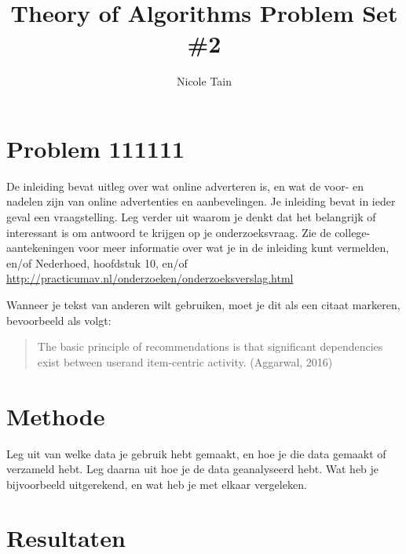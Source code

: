 \documentclass[11pt]{article}
\title{Theory of Algorithms Problem Set \#2}
\author{Nicole Tain}
\begin{document}
\maketitle                  %
\thispagestyle{empty}       %

\section*{Problem 111111}

De inleiding bevat uitleg over wat online adverteren is, en wat de voor- en nadelen zijn van online advertenties en aanbevelingen. Je inleiding bevat in ieder geval een vraagstelling. Leg verder uit waarom je denkt dat het belangrijk of interessant is om antwoord te krijgen op je onderzoeksvraag. Zie de college-aantekeningen voor meer informatie over wat je in de inleiding kunt vermelden, en/of Nederhoed, hoofdstuk 10, en/of \url{http://practicumav.nl/onderzoeken/onderzoeksverslag.html}

Wanneer je tekst van anderen wilt gebruiken, moet je dit als een citaat markeren, bevoorbeeld als volgt: 

\begin{quote}
The basic principle of recommendations is that significant dependencies exist between userand
item-centric activity. (Aggarwal, 2016)
\end{quote}


\section*{Methode}

Leg uit van welke data je gebruik hebt gemaakt, en hoe je die data gemaakt of verzameld hebt. Leg daarna uit hoe je de data geanalyseerd hebt. Wat heb je bijvoorbeeld uitgerekend, en wat heb je met elkaar vergeleken.

\section*{Resultaten }
\end{document}
